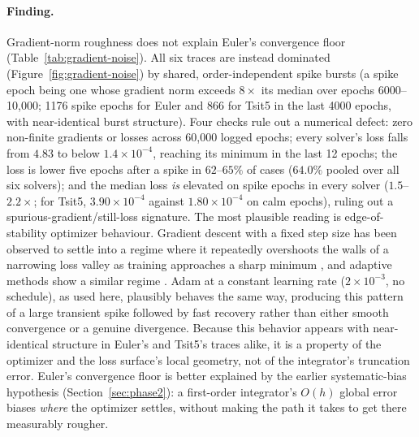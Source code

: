 \paragraph{Finding.} Gradient-norm roughness does not explain Euler's
convergence floor (Table~\ref{tab:gradient-noise}). All six traces are
instead dominated (Figure~\ref{fig:gradient-noise}) by shared,
order-independent spike bursts (a spike epoch being one whose gradient norm
exceeds $8\times$ its median over epochs 6000--10{,}000; 1176 spike epochs for
Euler and 866 for Tsit5 in the last 4000 epochs, with near-identical burst
structure). Four checks rule out a numerical defect: zero non-finite
gradients or losses across 60{,}000 logged epochs; every solver's loss falls
from $4.83$ to below $1.4\times10^{-4}$, reaching its minimum in the last 12
epochs; the loss is lower five epochs after a spike in $62$--$65\%$ of cases
($64.0\%$ pooled over all six solvers); and the median loss \emph{is} elevated
on spike epochs in every solver ($1.5$--$2.2\times$; for Tsit5,
$3.90\times10^{-4}$ against $1.80\times10^{-4}$ on calm epochs), ruling out a
spurious-gradient/still-loss signature. The most plausible reading is
edge-of-stability optimizer behaviour. Gradient descent with a fixed step size
has been observed to settle into a regime where it repeatedly overshoots the
walls of a narrowing loss valley as training approaches a sharp minimum
\cite{cohen2021eos}, and adaptive methods show a similar regime
\cite{cohen2022adaptive}. Adam at a constant learning rate
($2\times10^{-3}$, no schedule), as used here, plausibly behaves the same way,
producing this pattern of a large transient spike followed by fast recovery
rather than either smooth convergence or a genuine divergence. Because this behavior
appears with near-identical structure in Euler's and Tsit5's traces alike,
it is a property of the optimizer and the loss surface's local geometry, not
of the integrator's truncation error. Euler's convergence floor is better
explained by the earlier systematic-bias hypothesis (Section~\ref{sec:phase2}):
a first-order integrator's $O(h)$ global error biases \emph{where} the
optimizer settles, without making the path it takes to get there measurably
rougher.

\FloatBarrier
